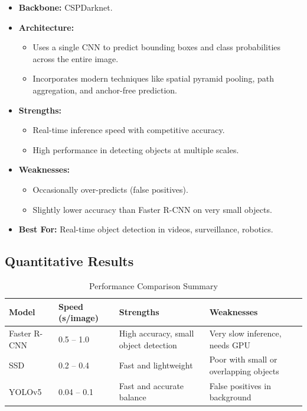 \documentclass[12pt]{article}
\begin{document}
\begin{itemize}
    \item \textbf{Backbone:} CSPDarknet.
    \item \textbf{Architecture:}
    \begin{itemize}
        \item Uses a single CNN to predict bounding boxes and class probabilities across the entire image.
        \item Incorporates modern techniques like spatial pyramid pooling, path aggregation, and anchor-free prediction.
    \end{itemize}
    \item \textbf{Strengths:}
    \begin{itemize}
        \item Real-time inference speed with competitive accuracy.
        \item High performance in detecting objects at multiple scales.
    \end{itemize}
    \item \textbf{Weaknesses:}
    \begin{itemize}
        \item Occasionally over-predicts (false positives).
        \item Slightly lower accuracy than Faster R-CNN on very small objects.
    \end{itemize}
    \item \textbf{Best For:} Real-time object detection in videos, surveillance, robotics.
\end{itemize}


\subsection*{Quantitative Results}

\begin{table}[H]
\centering
\caption{Performance Comparison Summary}
\begin{tabular}{@{}l p{4cm} p{5cm} p{5cm}@{}}
\toprule
\textbf{Model} & \textbf{Speed (s/image)} & \textbf{Strengths} & \textbf{Weaknesses} \\
\midrule
Faster R-CNN & 0.5 -- 1.0 & High accuracy, small object detection & Very slow inference, needs GPU \\
SSD & 0.2 -- 0.4 & Fast and lightweight & Poor with small or overlapping objects \\
YOLOv5 & 0.04 -- 0.1 & Fast and accurate balance & False positives in background \\
\bottomrule
\end{tabular}
\end{table}
\end{document}
